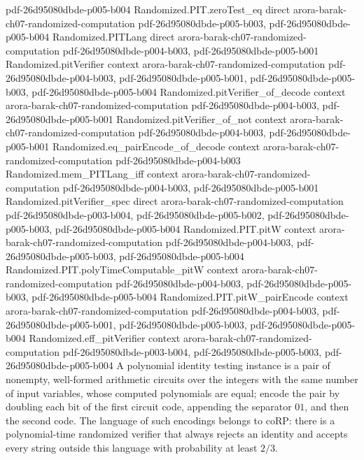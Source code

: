 \begin{theorem}
{    pdf-26d95080dbde-p005-b004}
\proofstep
  {Randomized.PIT.zeroTest_eq}
  {direct}
  {arora-barak-ch07-randomized-computation}
  {pdf-26d95080dbde-p005-b003,
    pdf-26d95080dbde-p005-b004}
\proofstep
  {Randomized.PITLang}
  {direct}
  {arora-barak-ch07-randomized-computation}
  {pdf-26d95080dbde-p004-b003,
    pdf-26d95080dbde-p005-b001}
\proofstep
  {Randomized.pitVerifier}
  {context}
  {arora-barak-ch07-randomized-computation}
  {pdf-26d95080dbde-p004-b003,
    pdf-26d95080dbde-p005-b001,
    pdf-26d95080dbde-p005-b003,
    pdf-26d95080dbde-p005-b004}
\proofstep
  {Randomized.pitVerifier_of_decode}
  {context}
  {arora-barak-ch07-randomized-computation}
  {pdf-26d95080dbde-p004-b003,
    pdf-26d95080dbde-p005-b001}
\proofstep
  {Randomized.pitVerifier_of_not}
  {context}
  {arora-barak-ch07-randomized-computation}
  {pdf-26d95080dbde-p004-b003,
    pdf-26d95080dbde-p005-b001}
\proofstep
  {Randomized.eq_pairEncode_of_decode}
  {context}
  {arora-barak-ch07-randomized-computation}
  {pdf-26d95080dbde-p004-b003}
\proofstep
  {Randomized.mem_PITLang_iff}
  {context}
  {arora-barak-ch07-randomized-computation}
  {pdf-26d95080dbde-p004-b003,
    pdf-26d95080dbde-p005-b001}
\proofstep
  {Randomized.pitVerifier_spec}
  {direct}
  {arora-barak-ch07-randomized-computation}
  {pdf-26d95080dbde-p003-b004,
    pdf-26d95080dbde-p005-b002,
    pdf-26d95080dbde-p005-b003,
    pdf-26d95080dbde-p005-b004}
\proofstep
  {Randomized.PIT.pitW}
  {context}
  {arora-barak-ch07-randomized-computation}
  {pdf-26d95080dbde-p004-b003,
    pdf-26d95080dbde-p005-b003,
    pdf-26d95080dbde-p005-b004}
\proofstep
  {Randomized.PIT.polyTimeComputable_pitW}
  {context}
  {arora-barak-ch07-randomized-computation}
  {pdf-26d95080dbde-p004-b003,
    pdf-26d95080dbde-p005-b003,
    pdf-26d95080dbde-p005-b004}
\proofstep
  {Randomized.PIT.pitW_pairEncode}
  {context}
  {arora-barak-ch07-randomized-computation}
  {pdf-26d95080dbde-p004-b003,
    pdf-26d95080dbde-p005-b001,
    pdf-26d95080dbde-p005-b003,
    pdf-26d95080dbde-p005-b004}
\proofstep
  {Randomized.eff_pitVerifier}
  {context}
  {arora-barak-ch07-randomized-computation}
  {pdf-26d95080dbde-p003-b004,
    pdf-26d95080dbde-p005-b003,
    pdf-26d95080dbde-p005-b004}
A polynomial identity testing instance is a pair of nonempty, well-formed arithmetic
circuits over the integers with the same number of input variables, whose computed
polynomials are equal; encode the pair by doubling each bit of the first circuit code,
appending the separator $01$, and then the second code. The language of such encodings
belongs to coRP: there is a polynomial-time randomized verifier that always rejects an
identity and accepts every string outside this language with probability at least $2/3$.
\end{theorem}

